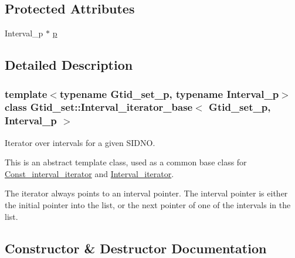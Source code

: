 \subsection*{Protected Attributes}
\begin{DoxyCompactItemize}
\item 
Interval\+\_\+p $\ast$ \mbox{\hyperlink{classGtid__set_1_1Interval__iterator__base_ab8609fb05e3782e8a73e496d35cbc217}{p}}
\end{DoxyCompactItemize}


\subsection{Detailed Description}
\subsubsection*{template$<$typename Gtid\+\_\+set\+\_\+p, typename Interval\+\_\+p$>$\newline
class Gtid\+\_\+set\+::\+Interval\+\_\+iterator\+\_\+base$<$ Gtid\+\_\+set\+\_\+p, Interval\+\_\+p $>$}

Iterator over intervals for a given S\+I\+D\+NO.

This is an abstract template class, used as a common base class for \mbox{\hyperlink{classGtid__set_1_1Const__interval__iterator}{Const\+\_\+interval\+\_\+iterator}} and \mbox{\hyperlink{classGtid__set_1_1Interval__iterator}{Interval\+\_\+iterator}}.

The iterator always points to an interval pointer. The interval pointer is either the initial pointer into the list, or the next pointer of one of the intervals in the list. 

\subsection{Constructor \& Destructor Documentation}
\mbox{\label{classGtid__set_1_1Interval__iterator__base_a679998deae5692929946999547b888fc}} 
